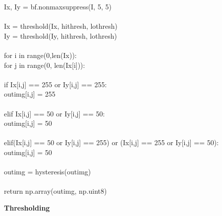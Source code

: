 \documentclass{article}
\begin{document}
	\indent I\textunderscore x, I\textunderscore y = bf.non\textunderscore max\textunderscore suppress(I, 5, 5)\\
	\\
	\indent I\textunderscore x = threshold(I\textunderscore x, hi\textunderscore thresh, lo\textunderscore thresh)\\
	\indent I\textunderscore y = threshold(I\textunderscore y, hi\textunderscore thresh, lo\textunderscore thresh)\\
	\\
	\indent for i in range(0,len(I\textunderscore x)):\\
	\indent \indent for j in range(0, len(I\textunderscore x[i])):\\
	\\
	\indent \indent \indent if I\textunderscore x[i,j] == 255 or I\textunderscore y[i,j] == 255:\\
	\indent \indent \indent \indent out\textunderscore img[i,j] = 255\\
	\\
	\indent \indent \indent elif I\textunderscore x[i,j] == 50 or I\textunderscore y[i,j] == 50:\\
	\indent \indent \indent \indent out\textunderscore img[i,j] = 50\\
	\\
	\indent \indent \indent elif(I\textunderscore x[i,j] == 50 or I\textunderscore y[i,j] == 255) or (I\textunderscore x[i,j] == 255 or I\textunderscore y[i,j] == 50):\\
	\indent \indent \indent \indent out\textunderscore img[i,j] = 50\\
	\\
	\indent out\textunderscore img = hysteresis(out\textunderscore img)\\
	\\
	\indent return np.array(out\textunderscore img, np.uint8)\\
	
	\smallskip
	
	\noindent \textbf{Thresholding}
	
	\smallskip
	
\end{document}
